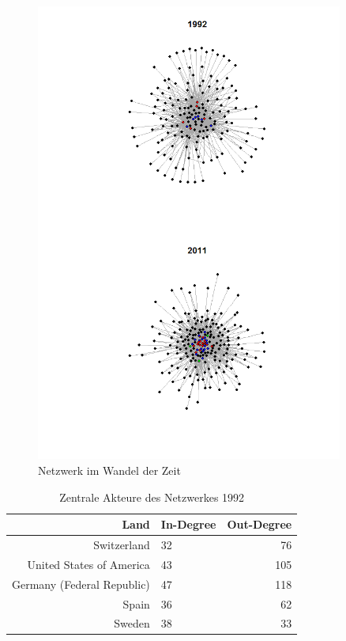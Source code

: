 \documentclass[a4paper,ngerman,oneside,titlepage,bibliography=totoc,11pt]{scrreprt}
\begin{document}
\begin{figure}[ht]
	\centering
		\includegraphics[width=0.90\textwidth]{Grafiken/ts_network.png}
	\caption{Netzwerk im Wandel der Zeit}
	\label{fig:ts_network}
\end{figure}



\begin{table}[h]
\centering
\footnotesize
\begin{tabular}{rlr}
  \hline
 Land 											& In-Degree & Out-Degree\\ 
  \hline
 Switzerland 								& 32				& 76\\ 
 United States of America 	& 43				& 105\\ 
 Germany (Federal Republic) & 47				& 118\\ 
 Spain 											& 36				& 62\\ 
 Sweden 										& 38 				& 33\\ 
 

   \hline
\end{tabular}
\caption{Zentrale Akteure des Netzwerkes 1992} 
\label{top_1991}
	\end{table}
	
\end{document}
